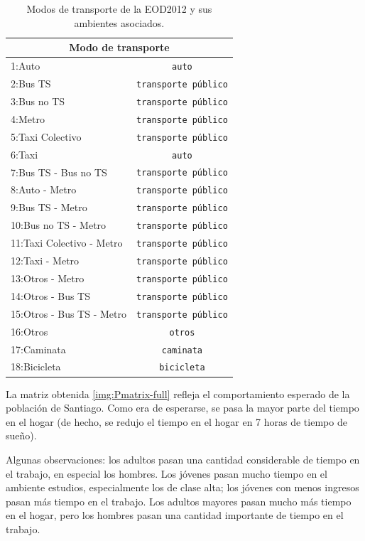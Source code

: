 \begin{table}[h!]
\centering
\begin{tabular}{||l|c||} 
 \hline
 \multicolumn{2}{||c||}{Modo de transporte} \\
 \hline
 1:Auto                        & \texttt{auto}\\
 2:Bus TS                      & \texttt{transporte público}\\
 3:Bus no TS                   & \texttt{transporte público}\\
 4:Metro                       & \texttt{transporte público}\\
 5:Taxi Colectivo              & \texttt{transporte público}\\
 6:Taxi                        & \texttt{auto}\\
 7:Bus TS - Bus no TS          & \texttt{transporte público}\\
 8:Auto - Metro                & \texttt{transporte público}\\
 9:Bus TS - Metro              & \texttt{transporte público}\\
 10:Bus no TS - Metro          & \texttt{transporte público}\\
 11:Taxi Colectivo - Metro     & \texttt{transporte público}\\
 12:Taxi - Metro               & \texttt{transporte público}\\
 13:Otros - Metro              & \texttt{transporte público}\\
 14:Otros - Bus TS             & \texttt{transporte público}\\
 15:Otros - Bus TS - Metro     & \texttt{transporte público}\\
 16:Otros                      & \texttt{otros}\\
 17:Caminata                   & \texttt{caminata}\\
 18:Bicicleta                  & \texttt{bicicleta}\\
 \hline
\end{tabular}
\caption{Modos de transporte de la EOD2012 y sus ambientes asociados.}
\label{table:ambientes-modo-full}
\end{table}

La matriz obtenida \ref{img:Pmatrix-full} refleja el comportamiento esperado de la población de Santiago. Como era de esperarse, se pasa la mayor parte del tiempo en el hogar (de hecho, se redujo el tiempo en el hogar en 7 horas de tiempo de sueño). 

Algunas observaciones: los adultos pasan una cantidad considerable de tiempo en el trabajo, en especial los hombres. Los jóvenes pasan mucho tiempo en el ambiente estudios, especialmente los de clase alta; los jóvenes con menos ingresos pasan más tiempo en el trabajo. Los adultos mayores pasan mucho más tiempo en el hogar, pero los hombres pasan una cantidad importante de tiempo en el trabajo. 


